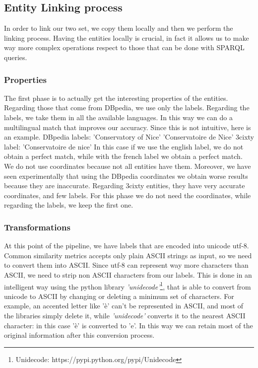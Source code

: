 \documentclass[paper=a4, fontsize=11pt]{scrartcl}
\begin{document}
\subsection{Entity Linking process}
In order to link our two set, we copy them locally and then we perform the linking process. Having the entities locally is crucial, in fact it allows us to make way more complex operations respect to those that can be done with SPARQL queries.
\subsubsection{Properties}
The first phase is to actually get the interesting properties of the entities. Regarding those that come from DBpedia, we use only the labels. Regarding the labels, we take them in all the available languages. In this way we can do a multilingual match that improves our accuracy. Since this is not intuitive, here is an example.
DBpedia labels:
'Conservatory of Nice'
'Conservatoire de Nice'
3cixty label: 'Conservatoire de nice'
In this case if we use the english label, we do not obtain a perfect match, while with the french label we obtain a perfect match.
We do not use coordinates because not all entities have them. Moreover, we have seen experimentally that using the DBpedia coordinates we obtain worse results because they are inaccurate.
Regarding 3cixty entities, they have very accurate coordinates, and few labels. For this phase we do not need the coordinates, while regarding the labels, we keep the first one.

\subsubsection{Transformations}
At this point of the pipeline, we have labels that are encoded into unicode utf-8. Common similarity metrics accepts only plain ASCII strings as input, so we need to convert them into ASCII. Since utf-8 can represent way more characters than ASCII, we need to strip non ASCII characters from our labels. This is done in an intelligent way using the python library \textit{'unidecode'}\footnote{Unidecode: https://pypi.python.org/pypi/Unidecode}, that is able to convert from unicode to ASCII by changing or deleting a minimum set of characters. For example, an accented letter like 'è' can't be represented in ASCII, and most of the libraries simply delete it, while \textit{'unidecode'} converts it to the nearest ASCII character: in this case 'è' is converted to 'e'. In this way we can retain most of the original information after this conversion process.
\end{document}

